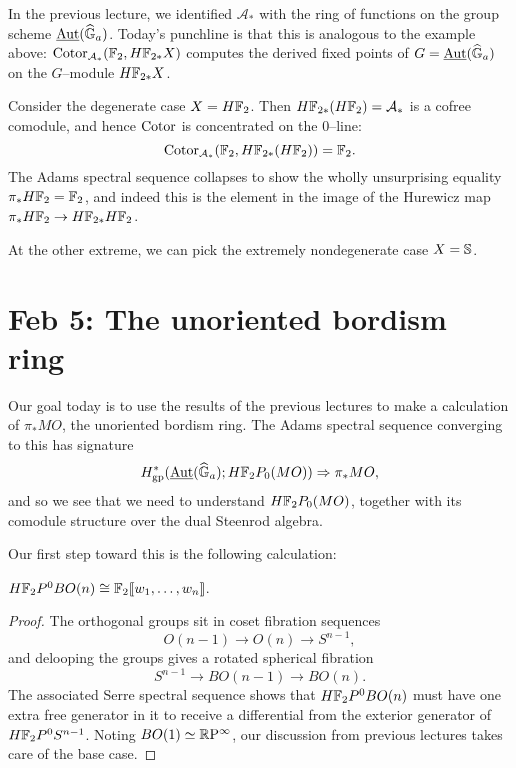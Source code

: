 
\begin{example}
In the previous lecture, we identified $\mathcal A_*$ with the ring of functions on the group scheme $\InternalAut(\G_a)$.  Today's punchline is that this is analogous to the example above: $\Cotor_{\mathcal A_*}(\F_2, H\F_{2*} X)$ computes the derived fixed points of $G = \InternalAut(\G_a)$ on the $G$--module $H\F_{2*} X$.
\end{example}

\begin{example}
Consider the degenerate case $X = H\F_2$.  Then $H\F_{2*}(H\F_2) = \mathcal A_*$ is a cofree comodule, and hence $\Cotor$ is concentrated on the $0$--line: \[\Cotor_{\mathcal A_*}(\F_2, H\F_{2*}(H\F_2)) = \F_2.\]  The Adams spectral sequence collapses to show the wholly unsurprising equality $\pi_* H\F_2 = \F_2$, and indeed this is the element in the image of the Hurewicz map $\pi_* H\F_2 \to H\F_{2*} H\F_2$.
\end{example}

\begin{example}
At the other extreme, we can pick the extremely nondegenerate case $X = \S$. 
\end{example}










\section{Feb 5: The unoriented bordism ring}

Our goal today is to use the results of the previous lectures to make a calculation of $\pi_* MO$, the unoriented bordism ring.  The Adams spectral sequence converging to this has signature \[H^*_{\mathrm{gp}}(\InternalAut(\G_a); H\F_2P_0(MO)) \Rightarrow \pi_* MO,\] and so we see that we need to understand $H\F_2P_0(MO)$, together with its comodule structure over the dual Steenrod algebra.

Our first step toward this is the following calculation:
\begin{lemma}
$H\F_2P^0 BO(n) \cong \F_2 \llbracket w_1, \ldots, w_n \rrbracket$.
\end{lemma}
\begin{proof}
The orthogonal groups sit in coset fibration sequences \[O(n-1) \to O(n) \to S^{n-1},\] and delooping the groups gives a rotated spherical fibration \[S^{n-1} \to BO(n-1) \to BO(n).\]  The associated Serre spectral sequence shows that $H\F_2P^0 BO(n)$ must have one extra free generator in it to receive a differential from the exterior generator of $H\F_2P^0 S^{n-1}$.  Noting $BO(1) \simeq \RP^\infty$, our discussion from previous lectures takes care of the base case.
\end{proof}

